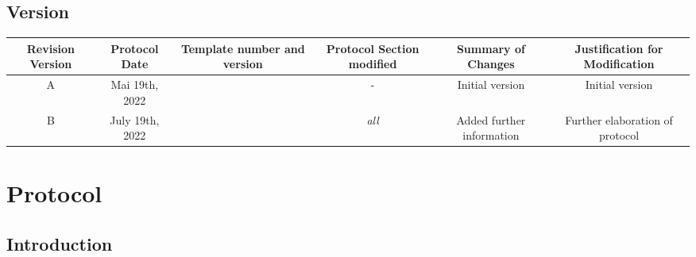 \section{Version}
\begin{tabularx}{1\textwidth}{@{}C *{5}{C}@{}}
\toprule
\textbf{Revision Version} & \textbf{Protocol Date} & \textbf{Template number and version} & \textbf{Protocol Section modified} & \textbf{Summary of Changes} & \textbf{Justification for Modification}\\
\midrule
A & Mai 19th, 2022 &  & - & Initial version & Initial version \\
B & July 19th, 2022 &  & \textit{all} & Added further information & Further elaboration of protocol\\
\bottomrule
\end{tabularx}


\chapter{Protocol}
\section{Introduction}
